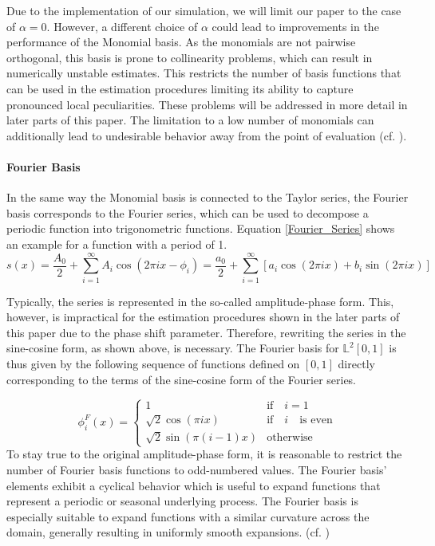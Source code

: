 \documentclass[11pt,twoside,a4paper]{article}
\begin{document}
	Due to the implementation of our simulation, we will limit our paper to the case of $\alpha = 0$. However, a different choice of $\alpha$ could lead to improvements in the performance of the Monomial basis.
	As the monomials are not pairwise orthogonal, this basis is prone to collinearity problems, which can result in numerically unstable estimates. This restricts the number of basis functions that can be used in the estimation procedures limiting its ability to capture pronounced local peculiarities. These problems will be addressed in more detail in later parts of this paper. The limitation to a low number of monomials can additionally lead to undesirable behavior away from the point of evaluation (cf. \cite{ramsay_functional_2005}).
	\vspace{-0.2cm}
	
	\paragraph{Fourier Basis}
	In the same way the Monomial basis is connected to the Taylor series, the Fourier basis corresponds to the Fourier series, which can be used to decompose a periodic function into trigonometric functions. Equation \ref{Fourier_Series} shows an example for a function with a period of 1.
	\begin{equation}\label{Fourier_Series}
		s(x) = \frac{A_0}{2} + \sum_{i = 1}^{\infty} A_i \cos(2\pi i x - \phi_i) = \frac{a_0}{2} + \sum_{i = 1}^{\infty}\left[a_i \cos(2\pi i x) + b_i \sin(2\pi i x)\right]
	\end{equation}
	
	Typically, the series is represented in the so-called amplitude-phase form. This, however, is impractical for the estimation procedures shown in the later parts of this paper due to the phase shift parameter. Therefore, rewriting the series in the sine-cosine form, as shown above, is necessary.
	The Fourier basis for $\mathbb{L}^2[0,1]$ is thus given by the following sequence of functions defined on $[0,1]$ directly corresponding to the terms of the sine-cosine form of the Fourier series.
	
	\begin{equation}
		\phi_{i}^{F}(x) = 
		\begin{cases}
			1 & \text{if} \quad i = 1\\
			\sqrt{2} \cos(\pi i x) & \text{if} \quad i \quad \text{is even} \\
			\sqrt{2} \sin(\pi (i-1)x) & \text{otherwise}
		\end{cases}
	\end{equation}
	To stay true to the original amplitude-phase form, it is reasonable to restrict the number of Fourier basis functions to odd-numbered values. The Fourier basis' elements exhibit a cyclical behavior which is useful to expand functions that represent a periodic or seasonal underlying process. The Fourier basis is especially suitable to expand functions with a similar curvature across the domain, generally resulting in uniformly smooth expansions. (cf. \cite{ramsay_functional_2005})
	\vspace{-0.2cm}
\end{document}

